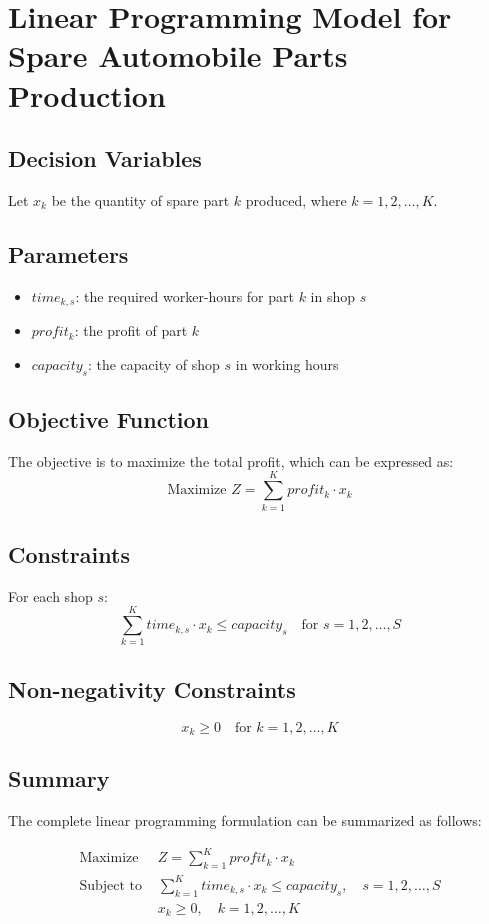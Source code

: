 \documentclass{article}
\begin{document}
\section*{Linear Programming Model for Spare Automobile Parts Production}

\subsection*{Decision Variables}
Let \( x_k \) be the quantity of spare part \( k \) produced, where \( k = 1, 2, \ldots, K \).

\subsection*{Parameters}
\begin{itemize}
    \item \( time_{k,s} \): the required worker-hours for part \( k \) in shop \( s \)
    \item \( profit_k \): the profit of part \( k \)
    \item \( capacity_s \): the capacity of shop \( s \) in working hours
\end{itemize}

\subsection*{Objective Function}
The objective is to maximize the total profit, which can be expressed as:
\[
\text{Maximize } Z = \sum_{k=1}^{K} profit_k \cdot x_k
\]

\subsection*{Constraints}
For each shop \( s \):
\[
\sum_{k=1}^{K} time_{k,s} \cdot x_k \leq capacity_s \quad \text{for } s = 1, 2, \ldots, S
\]

\subsection*{Non-negativity Constraints}
\[
x_k \geq 0 \quad \text{for } k = 1, 2, \ldots, K
\]

\subsection*{Summary}
The complete linear programming formulation can be summarized as follows:

\begin{align*}
\text{Maximize } & Z = \sum_{k=1}^{K} profit_k \cdot x_k \\
\text{Subject to } & \sum_{k=1}^{K} time_{k,s} \cdot x_k \leq capacity_s, \quad s = 1, 2, \ldots, S \\
                   & x_k \geq 0, \quad k = 1, 2, \ldots, K
\end{align*}
\end{document}
